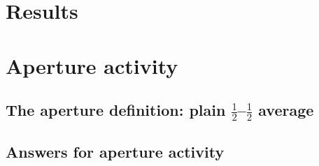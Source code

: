 \documentclass[11pt,a4paper]{article}
\begin{document}
\section{Results}\label{sec:results}


\section{Aperture activity}\label{sec:aperture}



\subsection{\texorpdfstring{The aperture definition: plain $\tfrac12$--$\tfrac12$ average}{The aperture definition: plain half-half average}}\label{sec:ap:plain}



\subsection{Answers for aperture activity}\label{sec:ap:answers}

\end{document}

